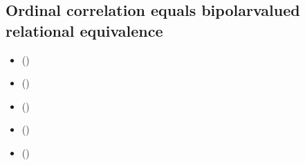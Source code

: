 \documentclass[a4paper,12pt,english]{sphinxhowto}
\begin{document}
\subsection{Ordinal correlation equals bipolar\sphinxhyphen{}valued relational equivalence}
\label{\detokenize{pearls:ordinal-correlation-equals-bipolar-valued-relational-equivalence}}\label{\detokenize{pearls:ordinalcorrelation-tutorial-label}}
\begin{sphinxcontents}
\begin{itemize}
\item {} 
\sphinxAtStartPar
{}\label{\detokenize{pearls:id144}}{\hyperref[\detokenize{pearls:kendall-s-tau-index}]{}} ()

\item {} 
\sphinxAtStartPar
{}\label{\detokenize{pearls:id145}}{\hyperref[\detokenize{pearls:bipolar-valued-relational-equivalence}]{}} ()

\item {} 
\sphinxAtStartPar
{}\label{\detokenize{pearls:id146}}{\hyperref[\detokenize{pearls:fitness-of-ranking-heuristics}]{}} ()

\item {} 
\sphinxAtStartPar
{}\label{\detokenize{pearls:id147}}{\hyperref[\detokenize{pearls:illustrating-preference-divergences}]{}} ()

\item {} 
\sphinxAtStartPar
{}\label{\detokenize{pearls:id148}}{\hyperref[\detokenize{pearls:exploring-the-better-rated-and-the-as-well-as-rated-opinions}]{}} ()

\end{itemize}
\end{sphinxcontents}
\end{document}
